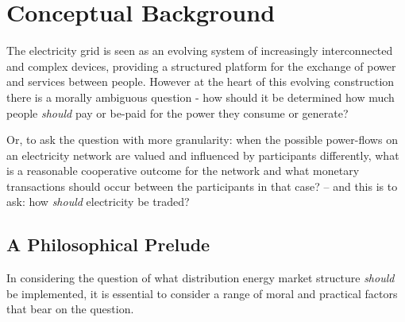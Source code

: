 \section{Conceptual Background}
\label{cha:background}

The electricity grid is seen as an evolving system of increasingly interconnected and complex devices, providing a structured platform for the exchange of power and services between people.
However at the heart of this evolving construction there is a morally ambiguous question - how should it be determined how much people \textit{should} pay or be-paid for the power they consume or generate?

Or, to ask the question with more granularity: when the possible power-flows on an electricity network are valued and influenced by participants differently, 
what is a reasonable cooperative outcome for the network and what monetary transactions should occur between the participants in that case? -- and this is to ask: how \textit{should} electricity be traded?\\


\subsection{A Philosophical Prelude}


In considering the question of what distribution energy market structure \textit{should} be implemented, it is essential to consider a range of moral and practical factors that bear on the question.

